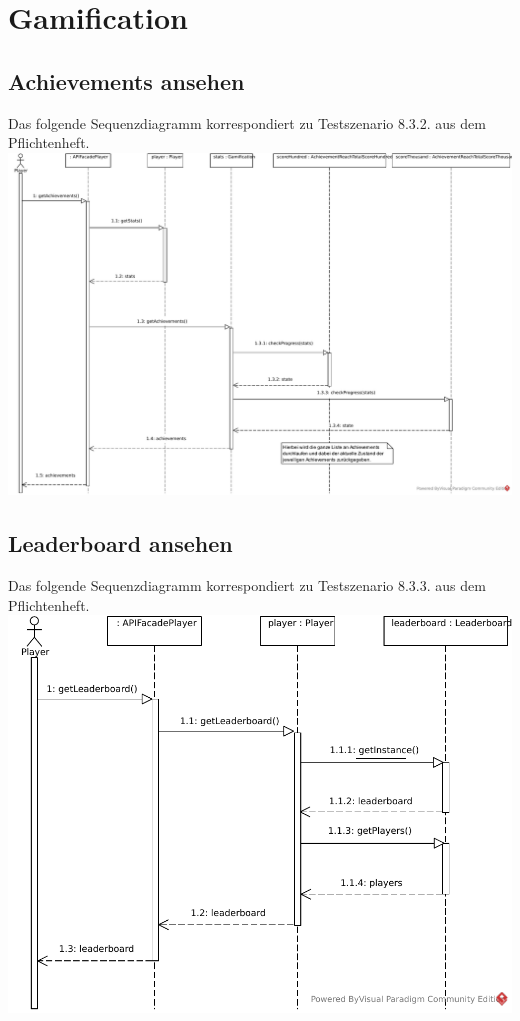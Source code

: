 \documentclass[a4paper]{scrreprt}
\begin{document}
    \section{Gamification}
    \subsection{Achievements ansehen}
    Das folgende Sequenzdiagramm korrespondiert zu Testszenario 8.3.2. aus dem Pflichtenheft. \\
    \includegraphics[width=\textwidth]{img/AchievementsAnsehen.pdf}


    \subsection{Leaderboard ansehen}
    Das folgende Sequenzdiagramm korrespondiert zu Testszenario 8.3.3. aus dem Pflichtenheft. \\
    \includegraphics[width=\textwidth]{img/LeaderboardAnsehen.pdf}
\end{document}
